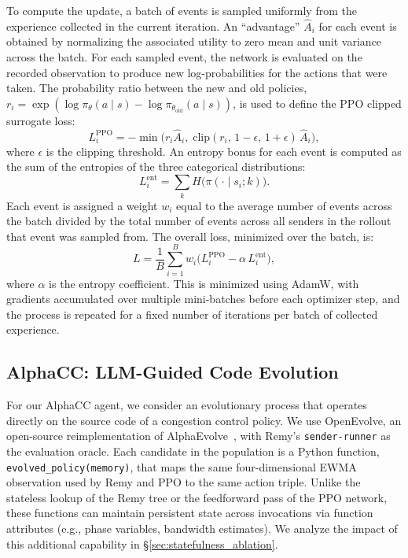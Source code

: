 To compute the update, a batch of events is sampled uniformly from the
experience collected in the current iteration. An ``advantage'' $\hat{A}_i$ for
each event is obtained by normalizing the associated utility to zero mean and
unit variance across the batch. For each sampled event, the network is evaluated
on the recorded observation to produce new log-probabilities for the actions
that were taken. The probability ratio between the new and old policies,
$r_i = \exp(\log \pi_{\theta}(a \mid s) - \log \pi_{\theta_{\text{old}}}(a \mid s))$,
is used to define the PPO clipped surrogate loss:
%
\begin{equation}
  L^{\text{PPO}}_i = -\min\bigl(r_i \hat{A}_i,\; \text{clip}(r_i,\, 1{-}\epsilon,\, 1{+}\epsilon)\, \hat{A}_i\bigr),
\end{equation}
%
where $\epsilon$ is the clipping threshold. An entropy bonus for each event is
computed as the sum of the entropies of the three categorical distributions:
%
\begin{equation}
  L^{\text{ent}}_i = \sum_k H\!\bigl(\pi(\cdot \mid s_i; k)\bigr).
\end{equation}
%
Each event is assigned a weight $w_i$ equal to the average number of events
across the batch divided by the total number of events across all senders in the
rollout that event was sampled from.
The overall loss, minimized over the batch, is:
%
\begin{equation}
  L = \frac{1}{B} \sum_{i=1}^{B} w_i \bigl( L^{\text{PPO}}_i - \alpha\, L^{\text{ent}}_i \bigr),
\end{equation}
%
where $\alpha$ is the entropy coefficient. This is minimized using AdamW, with
gradients accumulated over multiple mini-batches before each optimizer step, and
the process is repeated for a fixed number of iterations per batch of collected
experience.




\subsection{AlphaCC: LLM-Guided Code Evolution}
\label{sec:alphacc}

For our AlphaCC agent, we consider an evolutionary process that operates
directly on the source code of a congestion control policy. We use
OpenEvolve, an open-source reimplementation of
AlphaEvolve~\cite{alphaevolve2025}, with Remy's \texttt{sender-runner}
as the evaluation oracle. Each candidate in the population is a Python
function, \texttt{evolved\_policy(memory)}, that maps the same
four-dimensional EWMA observation used by Remy and PPO to the same
action triple. Unlike the stateless lookup of the Remy tree or the
feedforward pass of the PPO network, these functions can maintain
persistent state across invocations via function attributes (e.g.,
phase variables, bandwidth estimates). We analyze the impact of this
additional capability in \S\ref{sec:statefulness_ablation}.

